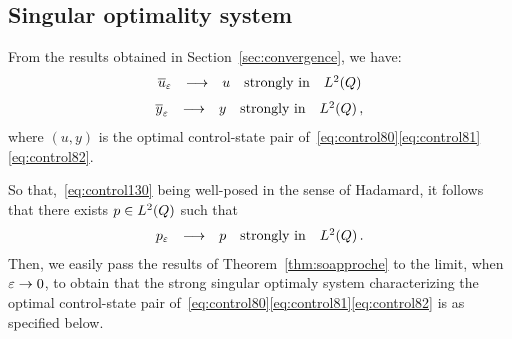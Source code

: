 \subsection{Singular optimality system}\label{sec:singularso}

From the results obtained in Section~\ref{sec:convergence}, we have:
\begin{equation*}
    \begin{array}{rclll}
        {\overline{u}}_{\varepsilon} & \longrightarrow & u & \text{strongly in} & L^{2}\!\left({Q}\right)
    \end{array}
\end{equation*}
\begin{equation*}
    \begin{array}{rclll}
        {\overline{y}}_{\varepsilon} & \longrightarrow & y & \text{strongly in} & L^{2}\!\left({Q}\right),
    \end{array}
\end{equation*}
where $(u,y)$ is the optimal control-state pair
of~\eqref{eq:control80}\eqref{eq:control81}\eqref{eq:control82}.

So that,~\eqref{eq:control130} being well-posed in the sense of Hadamard,
it follows that there exists $p\in L^{2}\!\left({Q}\right)$ such that
\begin{equation*}
    \begin{array}{rclll}
        p_{\varepsilon} & \longrightarrow & p & \text{strongly in} & L^{2}\!\left({Q}\right).
    \end{array}
\end{equation*}
Then, we easily pass the results of Theorem~\ref{thm:soapproche} to the
limit, when $\varepsilon\to 0$, to obtain that the strong singular optimaly
system characterizing the optimal control-state pair
of~\eqref{eq:control80}\eqref{eq:control81}\eqref{eq:control82} is as
specified below.

